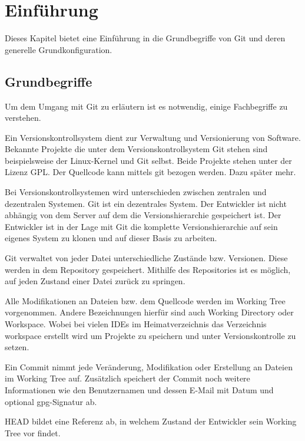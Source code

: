 \label{sec:einfuehrung}
\section{Einführung}
Dieses Kapitel bietet eine Einführung in die Grundbegriffe von Git und deren generelle Grundkonfiguration.

\label{sec:einfuehrung.grundbegriffe}
\subsection{Grundbegriffe}
Um dem Umgang mit Git zu erläutern ist es notwendig, einige Fachbegriffe zu verstehen. 

Ein Versionskontrollsystem dient zur Verwaltung und Versionierung von Software. Bekannte Projekte die unter dem Versionskontrollsystem Git stehen sind beispielsweise der Linux-Kernel und Git selbst. Beide Projekte stehen unter der Lizenz GPL. Der Quellcode kann mittels git bezogen werden. Dazu später mehr.

Bei Versionskontrollsystemen wird unterschieden zwischen zentralen und dezentralen Systemen. Git ist ein dezentrales System. Der Entwickler ist nicht abhängig von dem Server auf dem die Versionshierarchie gespeichert ist. Der Entwickler ist in der Lage mit Git die komplette Versionshierarchie auf sein eigenes System zu klonen und auf dieser Basis zu arbeiten.   

Git  verwaltet von jeder Datei unterschiedliche Zustände bzw. Versionen. Diese werden in dem Repository gespeichert. Mithilfe des Repositories ist es möglich, auf jeden Zustand einer Datei zurück zu springen.

Alle Modifikationen an Dateien bzw. dem Quellcode werden im Working Tree vorgenommen. Andere Bezeichnungen hierfür sind auch Working Directory oder Workspace. Wobei bei vielen IDEs im Heimatverzeichnis das Verzeichnis workspace erstellt wird um Projekte zu speichern und unter Versionskontrolle zu setzen. 

Ein Commit nimmt jede Veränderung, Modifikation oder Erstellung an Dateien im Working Tree auf. Zusätzlich speichert der Commit noch weitere Informationen wie den Benutzernamen und dessen E-Mail mit Datum und optional gpg-Signatur ab.  

HEAD bildet eine Referenz ab, in welchem Zustand der Entwickler sein Working Tree vor findet. 

